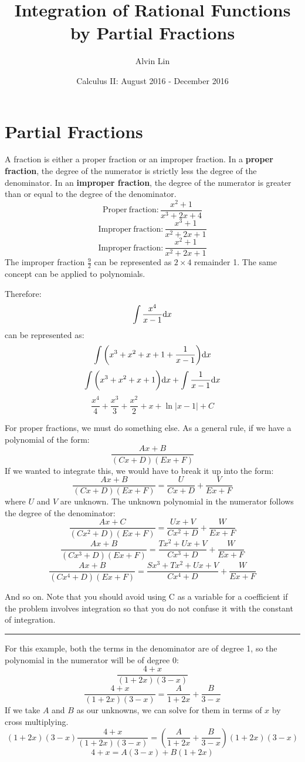 \documentclass{math}
\title{Integration of Rational Functions by Partial Fractions}
\author{Alvin Lin}
\date{Calculus II: August 2016 - December 2016}
\begin{document}
\maketitle

\section*{Partial Fractions}
A fraction is either a proper fraction or an improper fraction. In a
\textbf{proper fraction}, the degree of the numerator is strictly less the
degree of the denominator. In an \textbf{improper fraction}, the degree of
the numerator is greater than or equal to the degree of the denominator.
\[ \mathrm{Proper\ fraction}: \frac{x^{2}+1}{x^{3}+2x+4} \]
\[ \mathrm{Improper\ fraction}: \frac{x^{3}+1}{x^{2}+2x+1} \]
\[ \mathrm{Improper\ fraction}: \frac{x^{2}+1}{x^{2}+2x+1} \]
The improper fraction \( \frac{9}{2} \) can be represented as \( 2\times4 \)
remainder 1. The same concept can be applied to polynomials.
\begin{center}
\end{center}
Therefore:
\[ \int{\frac{x^{4}}{x-1}\mathrm{d}{x}} \]
can be represented as:
\[ \int{\bigg(x^{3}+x^{2}+x+1+\frac{1}{x-1}\bigg)\mathrm{d}{x}} \]
\[ \int{\bigg(x^{3}+x^{2}+x+1\bigg)\mathrm{d}{x}}+\int{\frac{1}{x-1}\mathrm{d}{x}} \]
\[ \frac{x^{4}}{4}+\frac{x^{3}}{3}+\frac{x^{2}}{2}+x+\ln|x-1|+C \]

For proper fractions, we must do something else. As a general rule, if we
have a polynomial of the form:
\[ \frac{Ax+B}{(Cx+D)(Ex+F)} \]
If we wanted to integrate this, we would have to break it up into the form:
\[ \frac{Ax+B}{(Cx+D)(Ex+F)} = \frac{U}{Cx+D}+\frac{V}{Ex+F} \]
where \( U \) and \( V \) are unknown. The unknown polynomial in the numerator
follows the degree of the denominator:
\[ \frac{Ax+C}{(Cx^{2}+D)(Ex+F)} = \frac{Ux+V}{Cx^{2}+D}+\frac{W}{Ex+F} \]
\[ \frac{Ax+B}{(Cx^{3}+D)(Ex+F)} =
   \frac{Tx^{2}+Ux+V}{Cx^{3}+D}+\frac{W}{Ex+F} \]
\[ \frac{Ax+B}{(Cx^{4}+D)(Ex+F)} =
   \frac{Sx^{3}+Tx^{2}+Ux+V}{Cx^{4}+D}+\frac{W}{Ex+F} \]
\begin{center}
  And so on. Note that you should avoid using C as a variable for a coefficient
  if the problem involves integration so that you do not confuse it with the
  constant of integration.
\end{center}

\noindent\rule{13.7cm}{0.4pt}

For this example, both the terms in the denominator are of degree 1, so
the polynomial in the numerator will be of degree 0:
\[ \frac{4+x}{(1+2x)(3-x)} \]
\[ \frac{4+x}{(1+2x)(3-x)} = \frac{A}{1+2x}+\frac{B}{3-x} \]
If we take \( A \) and \( B \) as our unknowns, we can solve for them in terms
of \( x \) by cross multiplying.
\[ (1+2x)(3-x)\frac{4+x}{(1+2x)(3-x)} =
   (\frac{A}{1+2x}+\frac{B}{3-x})(1+2x)(3-x) \]
\[ 4+x = A(3-x)+B(1+2x) \]
\end{document}
